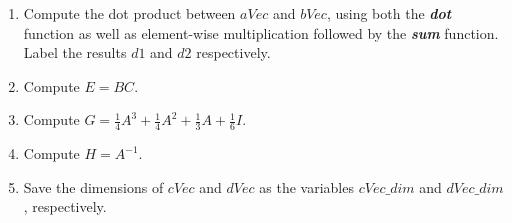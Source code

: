 \documentclass[11pt]{article}
\newenvironment{qparts}{\begin{enumerate}[{(}a{)}]}{\end{enumerate}}
\begin{document}
\begin{qparts}

    \item  Compute the dot product between $aVec$ and $bVec$, using both the
    \textbf{\textit{dot}} function as well as element-wise multiplication
    followed by the \textbf{\textit{sum}} function.
    Label the results $d1$ and $d2$ respectively.

    \item Compute $E = BC$.

    \item Compute 
    $G = \frac{1}{4}A^3 + \frac{1}{4}A^2 + \frac{1}{3}A + \frac{1}{6}I$. 

    \item Compute $H = A^{-1}$.

    \item Save the dimensions of $cVec$ and $dVec$ as the variables $cVec\_dim$ and
    $dVec\_dim$, respectively.

\end{qparts}
\end{document}
